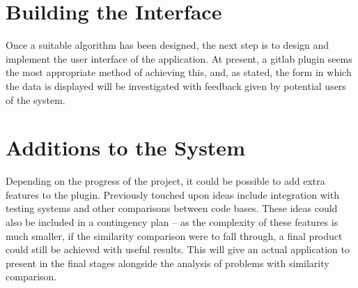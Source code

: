\section{Building the Interface}

Once a suitable algorithm has been designed, the next step is to design and 
implement the user interface of the application. At present, a gitlab plugin
seems the most appropriate method of achieving this, and, as stated, the
form in which the data is displayed will be investigated with feedback given by
potential users of the system.

\section{Additions to the System}

Depending on the progress of the project, it could be possible to add extra
features to the plugin. Previously touched upon ideas include integration with
testing systems and other comparisons between code bases. These ideas could also
be included in a contingency plan -- as the complexity of these features is much
smaller, if the similarity comparison were to fall through, a final product could
still be achieved with useful results. This will give an actual application to
present in the final stages alongside the analysis of problems with similarity
comparison.